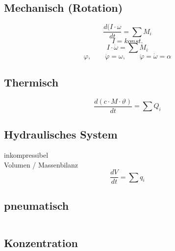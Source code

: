 \subsection{Mechanisch (Rotation)}
\[
    \frac{d(I \cdot \omega}{dt} = \sum M_i
\]
\[
    I = konst. 
\]
\[
    I \cdot \dot{\omega} = \sum M_i
\]
\[
    \varphi, \qquad \dot{\varphi} = \omega, 
    \qquad \ddot{\varphi} = \dot{\omega} = \alpha
\]

\subsection{Thermisch}
\[
    \frac{d(c \cdot M \cdot \vartheta)}{dt} = \sum Q_i
\]

\subsection{Hydraulisches System}
inkompressibel \\
Volumen / Massenbilanz
\[
    \frac{dV}{dt} = \sum q_i
\]

\subsection{pneumatisch}
\[
    ~
\]

\subsection{Konzentration}
\[
    ~
\]

